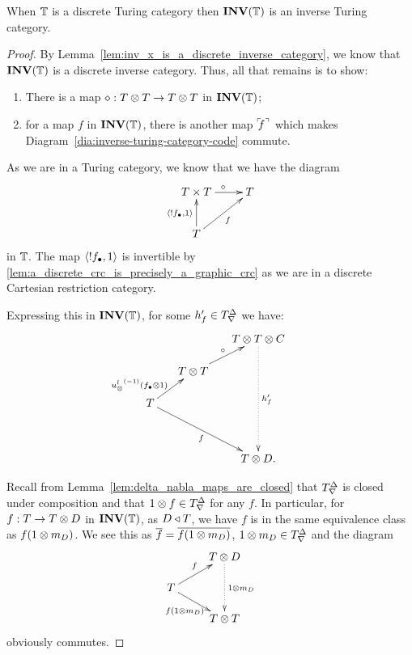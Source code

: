 \begin{lemma}\label{lem:discrete_turing_category_inverses_make_inverse_turing_category}
  When $\mathbb{T}$ is a discrete Turing category then $\mathbf{INV}({\mathbb{T}})$ is an inverse Turing category.
\end{lemma}
\begin{proof}
  By Lemma~\ref{lem:inv_x_is_a_discrete_inverse_category}, we know that $\mathbf{INV}({\mathbb{T}})$ is a discrete
  inverse category. Thus, all that remains is to show:
  \begin{enumerate}[{(}i{)}]
    \item There is a map $\diamond:T\otimes T \to T\otimes T$ in $\mathbf{INV}({\mathbb{T}})$;
    \item for a  map $f$ in $\mathbf{INV}({\mathbb{T}})$, there is another map ${}^\ulcorner\!\!f^\urcorner$ which makes
      Diagram~\ref{dia:inverse-turing-category-code} commute.
  \end{enumerate}

  As we are in a Turing category, we know that we have the diagram
      \[
        \xymatrix{
          T\times T \ar[r]^{\circ} & T \\
          T \ar[ur]_{f} \ar[u]^{\<!\code{f},1\>}
        }
      \]
  in $\mathbb{T}$.  The  map $\langle!f_{\bullet},1\rangle$ is invertible by
  \ref{lem:a_discrete_crc_is_precisely_a_graphic_crc} as we are in a discrete Cartesian restriction
  category.

  Expressing this in $\mathbf{INV}({\mathbb{T}})$, for some $h'_f \in {T}^{\Delta}_{\nabla}$ we have:
  \begin{equation}
    \xymatrix @C=15pt @R=15pt{
      & & T \* T\*C \ar@{.>}[dddd]^{h'_f}\\
      &T\*T \ar[ur]^{\circ} & & \\
      T \ar[ur]^(.3){\inv{\usl}(\code{f}\*1)} \ar[ddrr]_{f} \\
      & & & \\
      && T\*D.
    }\label{dia:pre-inverse-turing}
  \end{equation}

  Recall from Lemma~\ref{lem:delta_nabla_maps_are_closed} that ${T}^{\Delta}_{\nabla}$ is closed under
  composition and that $1\otimes f\in {T}^{\Delta}_{\nabla}$ for any $f$. In particular, for $f:T\to T\otimes D$ in
  $\mathbf{INV}({\mathbb{T}})$, as $D\triangleleft T$, we have $f$ is in the same equivalence class as $f(1\otimes m_D)$. We see
  this as $\overline{f} = \overline{f(1\otimes m_D)}$, $1\otimes m_D\in {T}^{\Delta}_{\nabla}$ and the diagram
  \[
    \xymatrix@R-10pt{
      &T\*D \ar@{.>}[dd]^{1\*m_D}\\
      T \ar[ur]^{f} \ar[dr]_{f(1\*m_D)}& \\
      &T\*T
    }
  \]
  obviously commutes.


\end{proof}
